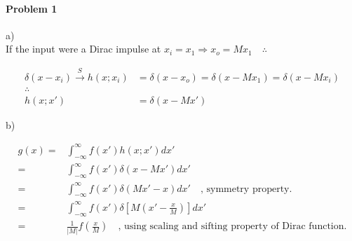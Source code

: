 \documentclass[11pt]{article}
\begin{document}
\MakeScribeTop


\paragraph{\noindent\textbf{\LARGE{Problem 1}}}


\begin{flushleft}
a) \\
If the input were a Dirac impulse at $x_i = x_1 \Rightarrow x_o = Mx_1 \quad \therefore{}$
\end{flushleft}   
\begin{equation*}
\begin{split}
    \delta(x - x_i) \xrightarrow{S} h(x ; x_i) & = \delta(x - x_o) = \delta (x - M x_1) = \delta(x - M x_i) \\
    \therefore{}\\
    h(x; x') & = \delta(x - Mx')
\end{split}
\end{equation*}

\begin{flushleft}
b) 
\end{flushleft}   
\begin{equation*}
\begin{split}
    g(x)    = & \int_{-\infty}^{\infty} f(x')h(x;x')dx' \\
            = & \int_{-\infty}^{\infty} f(x')\delta(x -Mx')dx'\\
            = & \int_{-\infty}^{\infty} f(x')\delta(Mx' - x )dx' \quad \text{, symmetry property.} \\
            = & \int_{-\infty}^{\infty} f(x')\delta[M(x' - \frac{x}{M})] dx'\\
            = & \frac{1}{|M|} f(\frac{x}{M}) \quad \text{, using scaling and sifting property of Dirac function.} 
\end{split}
\end{equation*}
\end{document}
